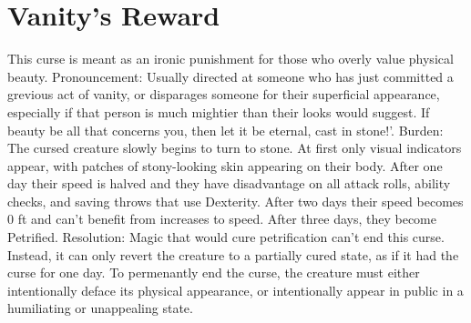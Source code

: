\documentclass[10pt,a4paper,twoside,twocolumn,openany,bg=print,nodeprecatedcode]{dndbook}
\begin{document}
\section{Vanity's Reward}
This curse is meant as an ironic punishment for those who overly value physical beauty.
Pronouncement: Usually directed at someone who has just committed a grevious act of vanity, or disparages someone for their superficial appearance, especially if that person is much mightier than their looks would suggest. If beauty be all that concerns you, then let it be eternal, cast in stone!'.
Burden: The cursed creature slowly begins to turn to stone. At first only visual indicators appear, with patches of stony-looking skin appearing on their body. After one day their speed is halved and they have disadvantage on all attack rolls, ability checks, and saving throws that use Dexterity. After two days their speed becomes 0 ft and can't benefit from increases to speed. After three days, they become Petrified.
Resolution: Magic that would cure petrification can't end this curse. Instead, it can only revert the creature to a partially cured state, as if it had the curse for one day. To permenantly end the curse, the creature must either intentionally deface its physical appearance, or intentionally appear in public in a humiliating or unappealing state.
\end{document}
